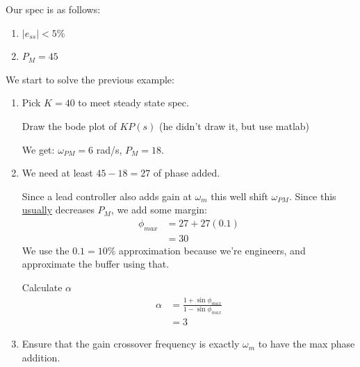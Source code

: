 \begin{enumerate}
\begin{enumerate}
\begin{enumerate}
\begin{itemize}
                                Our spec is as follows:
                                \begin{enumerate}
                                    \item $|e_{ss}| < 5 \%$
                                    \item $P_M = 45$ \textdegree
                                \end{enumerate}

                                We start to solve the previous example:
                                \begin{enumerate}
                                    \item Pick $K = 40$ to meet steady state spec.

                                        Draw the bode plot of $KP(s)$ (he didn't draw it, but use matlab)

                                        We get: $\omega_{PM} = 6$ rad/s, $P_M = 18$\textdegree.
                                    \item We need at least $45 - 18 = 27$ \textdegree of phase added.

                                        Since a lead controller also adds gain at $\omega_m$ this well shift $\omega_{PM}$.
                                        Since this \uline{usually} decreases $P_M$, we add some margin:
                                        \begin{align*}
                                            \phi_{max} &= 27 + 27(0.1) \\
                                            &= 30
                                        \end{align*}
                                        We use the $0.1 = 10$\% approximation because we're engineers, and approximate the buffer using that.

                                        Calculate $\alpha$
                                        \begin{align*}
                                            \alpha &= \frac{1 + \sin \phi_{max}}{1 - \sin \phi_{max}} \\
                                            &= 3
                                        \end{align*}
                                    \item Ensure that the gain crossover frequency is exactly $\omega_m$ to have the max phase addition.


\end{enumerate}
\end{itemize}
\end{enumerate}
\end{enumerate}
\end{enumerate}
